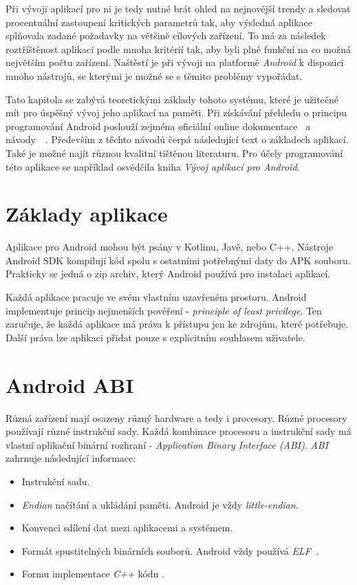 Při vývoji aplikací pro ni je tedy nutné brát ohled na nejnovější trendy a sledovat procentuální zastoupení kritických parametrů tak, aby výsledná aplikace splňovala zadané požadavky na většině cílových zařízení. To má za následek roztříštěnost aplikací podle mnoha kritérií tak, aby byli plně funkční na co možná největším počtu zařízení. Naštěstí je při vývoji na platformě \emph{Android} k dispozici mnoho nástrojů, se kterými je možné se s těmito problémy vypořádat.

Tato kapitola se zabývá teoretickými základy tohoto systému, které je užitečné mít pro úspěšný vývoj jeho aplikací na paměti. Při získávání přehledu o principu programování Android poslouží zejména oficiální online dokumentace~ a návody~~. Především z těchto návodů čerpá následující text o základech aplikací. Také je možné najít různou kvalitní tištěnou literaturu. Pro účely programování této aplikace se například osvědčila kniha \emph{Vývoj aplikací pro Android}\cite{android-Lacko}. 

\section{Základy aplikace}
Aplikace pro Android mohou být psány v Kotlinu, Javě, nebo C++. Nástroje Android SDK kompilují kód spolu s ostatními potřebnými daty do APK souboru. Prakticky se jedná o zip archiv, který Android používá pro instalaci aplikací.

Každá aplikace pracuje ve svém vlastním uzavřeném prostoru. Android implementuje princip nejmenších pověření - \emph{principle of least privilege}. Ten zaručuje, že každá aplikace má práva k přístupu jen ke zdrojům, které potřebuje. Další práva lze aplikaci přidat pouze s explicitním souhlasem uživatele.

\section{Android ABI}\label{sec:zaklady_abi}
Různá zařízení mají osazeny různý hardware a tedy i procesory. Různé procesory používají různé instrukční sady. Každá kombinace procesoru a instrukční sady má vlastní aplikační binární rozhraní - \emph{Application Binary Interface (ABI)}. \emph{ABI}~ zahrnuje následující informace:
\begin{itemize}
    \item Instrukční sadu.
    \item \emph{Endian} načítání a ukládání paměti. Android je vždy \emph{little-endian}.
    \item Konvenci sdílení dat mezi aplikacemi a systémem.
    \item Formát spustitelných binárních souborů. Android vždy používá \emph{ELF}~.
    \item Formu implementace \emph{C++} kódu .
\end{itemize}

